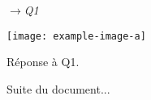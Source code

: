 \documentclass[12pt]{article}
\newif\ifDispRep
\newcommand{\MaQuest}[1]{\par\vspace{0.3\baselineskip}\noindent$\rightarrow$\textit{#1}\par\vspace{0.3\baselineskip}}
\begin{document}
	\MaQuest{Q1}
	
	\begin{MaReponse}
		\noindent
		\begin{minipage}{0.5\textwidth}
			\centering
			\texttt{[image: example-image-a]}
		\end{minipage}
		Réponse à Q1.
	\end{MaReponse}
	
	Suite du document...
\end{document}
